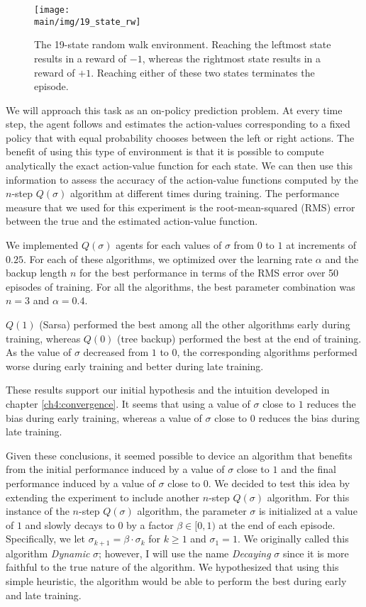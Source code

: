 \begin{figure}[t]
    \centering
    \texttt{[image: \\main/img/19\_state\_rw]}
    \caption[19-State Random Walk] {
    The 19-state random walk environment. 
    Reaching the leftmost state results in a reward of $-1$, whereas the rightmost state results in a reward of $+1$.
    Reaching either of these two states terminates the episode.
    }
    \label{fig:19staterw}
\end{figure}

We will approach this task as an on-policy prediction problem.
At every time step, the agent follows and estimates the action-values corresponding to a fixed policy that with equal probability chooses between the left or right actions.
The benefit of using this type of environment is that it is possible to compute analytically the exact action-value function for each state.
We can then use this information to assess the accuracy of the action-value functions computed by the $n$-step $Q(\sigma)$ algorithm at different times during training.
The performance measure that we used for this experiment is the root-mean-squared (RMS) error between the true and the estimated action-value function.

We implemented $Q(\sigma)$ agents for each values of $\sigma$ from $0$ to $1$ at increments of $0.25$.
For each of these algorithms, we optimized over the learning rate $\alpha$ and the backup length $n$ for the best performance in terms of the RMS error over 50 episodes of training. 
For all the algorithms, the best parameter combination was $n = 3$ and $\alpha = 0.4$.

$Q(1)$ (Sarsa) performed the best among all the other algorithms early during training, whereas $Q(0)$ (tree backup) performed the best at the end of training.
As the value of $\sigma$ decreased from $1$ to $0$, the corresponding algorithms performed worse during early training and better during late training.

These results support our initial hypothesis and the intuition developed in chapter \ref{ch4:convergence}.
It seems that using a value of $\sigma$ close to $1$ reduces the bias during early training, whereas a value of $\sigma$ close to $0$ reduces the bias during late training.

Given these conclusions, it seemed possible to device an algorithm that benefits from the initial performance induced by a value of $\sigma$ close to $1$ and the final performance induced by a value of $\sigma$ close to $0$.
We decided to test this idea by extending the experiment to include another $n$-step $Q(\sigma)$ algorithm.
For this instance of the $n$-step $Q(\sigma)$ algorithm, the parameter $\sigma$ is initialized at a value of $1$ and slowly decays to $0$ by a factor $\beta \in [0,1)$ at the end of each episode.
Specifically, we let $\sigma_{k+1} = \beta \cdot \sigma_k$ for $k \geq 1$ and $\sigma_1 = 1$.
We originally called this algorithm \textit{Dynamic} $\sigma$; however, I will use the name \textit{Decaying} $\sigma$ since it is more faithful to the true nature of the algorithm.
We hypothesized that using this simple heuristic, the algorithm would be able to perform the best during early and late training.

